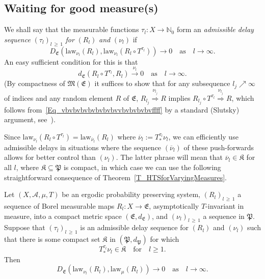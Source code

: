 \documentclass[10pt]{amsart}
\theoremstyle{definition}\newtheorem{defi}[theo]{Definition}\newtheorem{rema}[theo]{Remark}\newtheorem{exam}[theo]{Example}\newtheorem{exem}[theo]{Example}\newtheorem{nota}[theo]{Notation}
\newcommand{\clA}{\mathcal{A}}
\newcommand{\law}{\mathrm{law}}
\newcommand{\frkK}{\mathfrak{K}}
\newcommand{\frkP}{\mathfrak{P}}
\newcommand{\frkE}{\mathfrak{E}}
\newcommand{\frkM}{\mathfrak{M}}
\newcommand{\bbN}{\mathbb{N}}
\begin{document}
\subsection{Waiting for good measure(s)}
We shall say that the measurable functions $\tau_{l}:X\rightarrow\bbN_{0}$ form an \emph{admissible delay sequence} $(\tau_{l})_{l\,\geq\,1}$ \emph{for} $(R_{l})$ \emph{and} $(\nu_{l})$ if
\begin{equation}
D_{\frkE}\left(\law_{\nu_{l}}(R_{l}),\law_{\nu_{l}} \left(R_{l}\circ T^{\tau_{l}}\right)\right)\longrightarrow0\quad\text{as}\quad l\rightarrow
\infty.
\end{equation}
An easy sufficient condition for this is that
\begin{equation}\label{Eq_vbvbvbvbvbvbvbvvbvbvbvbvffff}
d_{\frkE}(R_{l}\circ T^{\tau_{l}},R_{l})\overset{\nu_{l}} {\longrightarrow}0\quad \text{as}\quad l\rightarrow\infty.
\end{equation}
(By compactness of $\frkM(\frkE)$ it suffices to show that for any subsequence $l_{j}\nearrow\infty$ of indices and any random element $R$ of $\frkE$, $R_{l_{j}}\overset{\nu_{l_{j}}}{\Longrightarrow}R$ implies $R_{l_{j}}\circ T^{\tau_{l}}\overset{\nu_{l_{j}}}{\Longrightarrow}R$, which follows from~\eqref{Eq_vbvbvbvbvbvbvbvvbvbvbvbvffff} by a standard (Slutsky) argument, see~\cite[Theorem~3.1]{Bi}).

Since $\law_{\nu_{l}}(R_{l}\circ T^{\tau_{l}})=\law _{\overline{\nu}_{l}}(R_{l})$ where $\overline{\nu}_{l}:=T_{\ast}^{\tau_{l} }\nu_{l}$, we can efficiently use admissible delays in situations where the sequence $(\overline{\nu}_{l})$ of these push-forwards allows for better control than $(\nu_{l})$. The latter phrase will mean that $\overline{\nu} _{l}\in\frkK$ for all $l$, where $\frkK\subseteq\frkP$ is compact, in which case we can use the following straightforward consequence of Theorem~\ref{T_HTSforVaryingMeasures}.

\begin{prop}\label{P_AsyInvarSeqNuLVsMu}
Let $(X,\clA,\mu,T)$ be an ergodic probability preserving system, $(R_{l})_{l\,\geq\,1}$ a sequence of Borel measurable maps $R_{l}:X\rightarrow\frkE$, asymptotically $T$-invariant in measure, into a compact metric space $(\frkE,d_{\frkE})$, and $(\nu_{l})_{l\,\geq\,1}$ a sequence in $\frkP$. Suppose that $(\tau _{l})_{l\,\geq\,1}$ is an admissible delay sequence for $(R_{l})$ and $(\nu_{l})$ such that there is some compact set $\frkK$ in $(\frkP,d_{\frkP})$ for which
\begin{equation}
T_{\ast}^{\tau_{l}}\nu_{l}\in\frkK\quad \text{for}\quad l\geq1.
\end{equation}
Then
\begin{equation}
D_{\frkE}\left(\law_{\nu_{l}}(R_{l}),\law_{\mu} (R_{l})\right)\longrightarrow0\quad\text{as}\quad l\rightarrow\infty .
\end{equation}
\end{prop}
\end{document}
